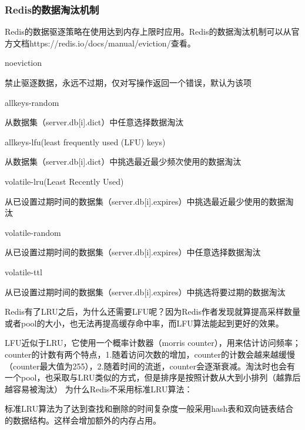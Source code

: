 \documentclass[../../../interview-questions.tex]{subfiles}
\begin{document}
\subsubsection{Redis的数据淘汰机制}

Redis的数据驱逐策略在使用达到内存上限时应用。Redis的数据淘汰机制可以从官方文档https://redis.io/docs/manual/eviction/查看。

noeviction

禁止驱逐数据，永远不过期，仅对写操作返回一个错误，默认为该项

allkeys-random

从数据集（server.db[i].dict）中任意选择数据淘汰

allkeys-lfu(least frequently used (LFU) keys)

从数据集（server.db[i].dict）中挑选最近最少频次使用的数据淘汰

volatile-lru(Least Recently Used)

从已设置过期时间的数据集（server.db[i].expires）中挑选最近最少使用的数据淘汰

volatile-random

从已设置过期时间的数据集（server.db[i].expires）中任意选择数据淘汰

volatile-ttl

从已设置过期时间的数据集（server.db[i].expires）中挑选将要过期的数据淘汰


Redis有了LRU之后，为什么还需要LFU呢？因为Redis作者发现就算提高采样数量或者pool的大小，也无法再提高缓存命中率，而LFU算法能起到更好的效果。

LFU近似于LRU，它使用一个概率计数器（morris counter），用来估计访问频率；counter的计数有两个特点，1.随着访问次数的增加，counter的计数会越来越缓慢（counter最大值为255），2.随着时间的流逝，counter会逐渐衰减。淘汰时也会有一个pool，也采取与LRU类似的方式，但是排序是按照计数从大到小排列（越靠后越容易被淘汰）
为什么Redis不采用标准LRU算法：

标准LRU算法为了达到查找和删除的时间复杂度一般采用hash表和双向链表结合的数据结构。这样会增加额外的内存占用。
\end{document}
